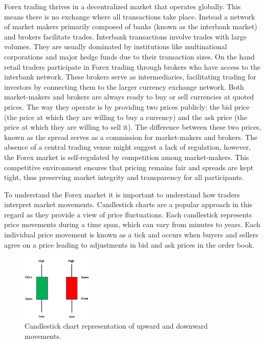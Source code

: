 Forex trading thrives in a decentralized market that operates globally. This means there is no exchange where all transactions take place. Instead a network of market makers primarily composed of banks (known as the interbank market) and brokers facilitate trades. Interbank transactions involve trades with large volumes. They are usually dominated by institutions like multinational corporations and major hedge funds due to their transaction sizes. On the hand retail traders participate in Forex trading through brokers who have access to the interbank network. These brokers serve as intermediaries, facilitating trading for investors by connecting them to the larger currency exchange network. Both market-makers and brokers are always ready to buy or sell currencies at quoted prices. The way they operate is by providing two prices publicly: the bid price (the price at which they are willing to buy a currency) and the ask price (the price at which they are willing to sell it). The difference between these two prices, known as the spread serves as a commission for market-makers and brokers. The absence of a central trading venue might suggest a lack of regulation, however, the Forex market is self-regulated by competition among market-makers. This competitive environment ensures that pricing remains fair and spreads are kept tight, thus preserving market integrity and transparency for all participants.

To understand the Forex market it is important to understand how traders interpret market movements. Candlestick charts are a popular approach in this regard as they provide a view of price fluctuations. Each candlestick represents price movements during a time span, which can vary from minutes to years. Each individual price movement is known as a tick and occurs when buyers and sellers agree on a price leading to adjustments in bid and ask prices in the order book.

\begin{figure}[htb!]
\centering
\includegraphics[width=0.3\textwidth]{Images/CandlestickChart.png}
\caption{Candlestick chart representation of upward and downward movements.}
\label{Figure:CandlestickChart}
\end{figure}

